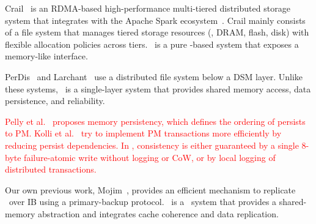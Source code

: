 Crail~\cite{crail} is an RDMA-based high-performance multi-tiered distributed storage system that integrates with the Apache Spark ecosystem~\cite{Zaharia12-NSDI}.
Crail mainly consists of a file system that manages tiered storage resources (\eg, DRAM, flash, disk) 
with flexible allocation policies across tiers.
\hotpot\ is a pure \nvm-based system that exposes a memory-like interface. 

PerDis~\cite{PerDis} and Larchant~\cite{Larchant,Larchant94} use a distributed file system below a DSM layer.
Unlike these systems, \hotpot\ is a single-layer system that provides shared memory access, data persistence, and reliability.


\textcolor{Red}
{
Pelly et al.~\cite{MemoryPersistency} proposes memory persistency, which defines
the ordering of persists to PM. Kolli et al.~\cite{pmxact-asplos16,Delegated-persist}
try to implement PM transactions more efficiently by reducing persist dependencies.
In \hotpot, consistency is either guaranteed by a single 8-byte failure-atomic write without logging or CoW,
or by local logging of distributed transactions.
}
\fi

Our own previous work, Mojim~\cite{Zhang15-Mojim}, provides an efficient mechanism to replicate \nvm\
over IB using a primary-backup protocol.
\hotpot\ is a \dsnvm\ system that provides a shared-memory abstraction
and integrates cache coherence and data replication.
